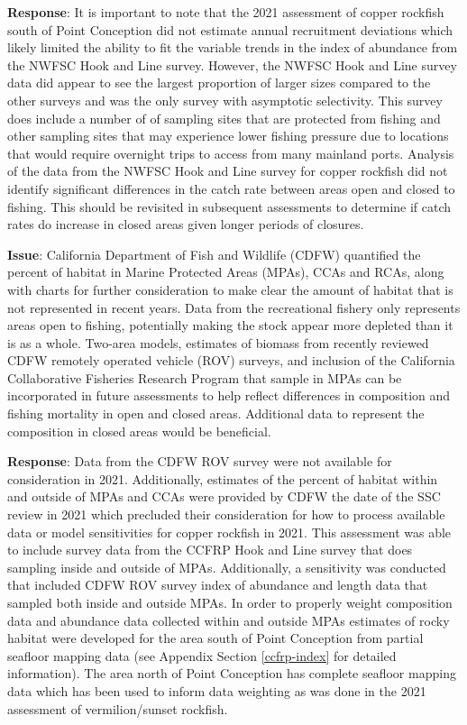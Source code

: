 \documentclass[11pt,
  letterpaper,
]{article}
\begin{document}
\textbf{Response}: It is important to note that the 2021 assessment of copper rockfish south of Point Conception did not estimate annual recruitment deviations which likely limited the ability to fit the variable trends in the index of abundance from the NWFSC Hook and Line survey. However, the NWFSC Hook and Line survey data did appear to see the largest proportion of larger sizes compared to the other surveys and was the only survey with asymptotic selectivity. This survey does include a number of of sampling sites that are protected from fishing and other sampling sites that may experience lower fishing pressure due to locations that would require overnight trips to access from many mainland ports. Analysis of the data from the NWFSC Hook and Line survey for copper rockfish did not identify significant differences in the catch rate between areas open and closed to fishing. This should be revisited in subsequent assessments to determine if catch rates do increase in closed areas given longer periods of closures.

\textbf{Issue}: California Department of Fish and Wildlife (CDFW) quantified the percent of habitat in Marine Protected Areas (MPAs), CCAs and RCAs, along with charts for further consideration to make clear the amount of habitat that is not represented in recent years. Data from the recreational fishery only represents areas open to fishing, potentially making the stock appear more depleted than it is as a whole. Two-area models, estimates of biomass from recently reviewed CDFW remotely operated vehicle (ROV) surveys, and inclusion of the California Collaborative Fisheries Research Program that sample in MPAs can be incorporated in future assessments to help reflect differences in composition and fishing mortality in open and closed areas. Additional data to represent the composition in closed areas would be beneficial.

\textbf{Response}: Data from the CDFW ROV survey were not available for consideration in 2021. Additionally, estimates of the percent of habitat within and outside of MPAs and CCAs were provided by CDFW the date of the SSC review in 2021 which precluded their consideration for how to process available data or model sensitivities for copper rockfish in 2021. This assessment was able to include survey data from the CCFRP Hook and Line survey that does sampling inside and outside of MPAs. Additionally, a sensitivity was conducted that included CDFW ROV survey index of abundance and length data that sampled both inside and outside MPAs. In order to properly weight composition data and abundance data collected within and outside MPAs estimates of rocky habitat were developed for the area south of Point Conception from partial seafloor mapping data (see Appendix Section \ref{ccfrp-index} for detailed information). The area north of Point Conception has complete seafloor mapping data which has been used to inform data weighting as was done in the 2021 assessment of vermilion/sunset rockfish.
\end{document}
